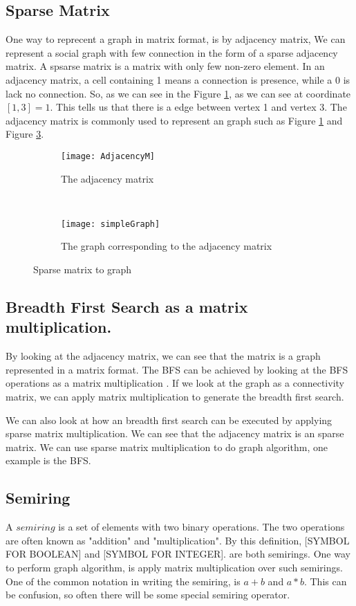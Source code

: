{\subsection{Sparse Matrix}
One way to reprecent a graph in matrix format, is by adjacency matrix, We can represent a social graph with few connection in the form of a sparse adjacency matrix. A spsarse matrix is a matrix with only few non-zero element. In an adjacency matrix, a cell containing 1 means a connection is presence, while a 0 is lack no connection. So, as we can see in the Figure \ref{fig:AdjacencyM}, as we can see at coordinate $[1,3] = 1$. This tells us that there is a edge between vertex 1 and vertex 3. The adjacency matrix is commonly used to represent an graph such as Figure \ref{fig:AdjacencyM} and Figure \ref{fig:matrix}.

\begin{figure}
	\begin{subfigure}{0.5\textwidth}
	\texttt{[image: AdjacencyM]}
	\caption{The adjacency matrix}
	\label{fig:AdjacencyM}
	\end{subfigure}
	~
	\begin{subfigure}{0.5\textwidth}
	\texttt{[image: simpleGraph]}
	\caption{The graph corresponding to the adjacency matrix}
	\label{fig:matrix}
	\end{subfigure}
 	\caption{Sparse matrix to graph}
\end{figure}

\subsection{Breadth First Search as a matrix multiplication.}
By looking at the adjacency matrix, we can see that the matrix is a graph represented in a matrix format. The BFS can be achieved by looking at the BFS operations as a matrix multiplication \cite{algoToMath}. If we look at the graph as a connectivity matrix, we can apply matrix multiplication to generate the breadth first search. 

We can also look at how an breadth first search can be executed by applying  sparse matrix multiplication. We can see that the adjacency matrix is an sparse matrix. We can use sparse matrix multiplication to do graph algorithm, one example is the BFS. 


\subsection{Semiring}
A $semiring$ is a set of elements with two binary operations. The two operations are often known as "addition" and "multiplication". By this definition, [SYMBOL FOR BOOLEAN] and [SYMBOL FOR INTEGER]. are both semirings.  One way to perform graph algorithm, is apply matrix multiplication over such semirings. One of the common notation in writing the semiring, is $a+b$ and $a \ast b$. This can be confusion, so often there will be some special semiring operator.



}
